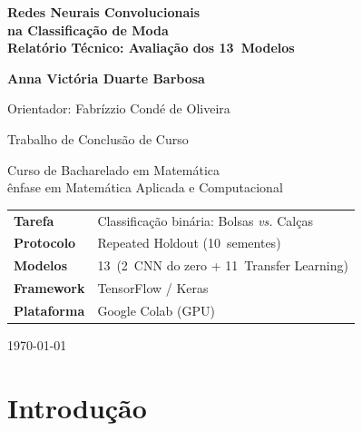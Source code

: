 \documentclass[12pt,a4paper]{article}
\begin{document}

\begin{titlepage}
  \centering
  \vspace*{2cm}
  {\Huge\bfseries\color{blue!70!black}
    Redes Neurais Convolucionais\\[0.4em]
    na Classificação de Moda\\[0.4em]
    \large\normalfont\color{black}
    Relatório Técnico: Avaliação dos 13~Modelos\par}
  \vspace{1.5cm}
  {\large\bfseries Anna Victória Duarte Barbosa\par}
  \vspace{0.3cm}
  {\large Orientador: Fabrízzio Condé de Oliveira\par}
  \vspace{0.5cm}
  {\large Trabalho de Conclusão de Curso\par}
  \vspace{0.2cm}
  {\large Curso de Bacharelado em Matemática\\[0.2em]
   ênfase em Matemática Aplicada e Computacional\par}
  \vspace{2cm}
  \begin{center}
    \begin{tabular}{lp{9cm}}
      \toprule
      \textbf{Tarefa} & Classificação binária: Bolsas \emph{vs.} Calças \\
      \textbf{Protocolo} & Repeated Holdout (10~sementes) \\
      \textbf{Modelos} & 13~(2~CNN do zero + 11~Transfer Learning) \\
      \textbf{Framework} & TensorFlow / Keras \\
      \textbf{Plataforma} & Google Colab (GPU) \\
      \bottomrule
    \end{tabular}
  \end{center}
  \vfill
  {\large\today\par}
\end{titlepage}

\tableofcontents
\clearpage

\section{Introdução}
\end{document}
